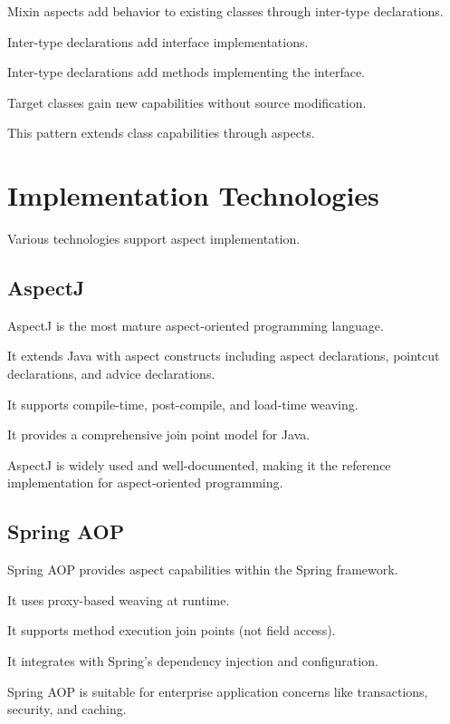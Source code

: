 \documentclass[11pt]{article}
\begin{document}
Mixin aspects add behavior to existing classes through inter-type declarations.

Inter-type declarations add interface implementations.

Inter-type declarations add methods implementing the interface.

Target classes gain new capabilities without source modification.

This pattern extends class capabilities through aspects.

\section{Implementation Technologies}

Various technologies support aspect implementation.

\subsection{AspectJ}

AspectJ is the most mature aspect-oriented programming language.

It extends Java with aspect constructs including aspect declarations, pointcut declarations, and advice declarations.

It supports compile-time, post-compile, and load-time weaving.

It provides a comprehensive join point model for Java.

AspectJ is widely used and well-documented, making it the reference implementation for aspect-oriented programming.

\subsection{Spring AOP}

Spring AOP provides aspect capabilities within the Spring framework.

It uses proxy-based weaving at runtime.

It supports method execution join points (not field access).

It integrates with Spring's dependency injection and configuration.

Spring AOP is suitable for enterprise application concerns like transactions, security, and caching.
\end{document}
